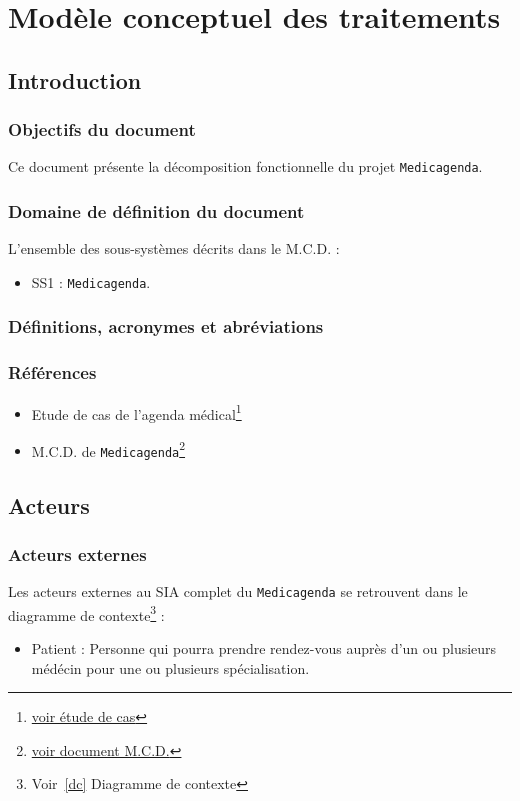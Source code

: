 \documentclass[a4paper, 11pt]{report}
\begin{document}

\tableofcontents

\chapter{Modèle conceptuel des traitements}

\section{Introduction}

\subsection{Objectifs du document}
Ce document présente la décomposition fonctionnelle du projet \texttt{Medicagenda}.
\subsection{Domaine de définition du document}
L'ensemble des sous-systèmes décrits dans le M.C.D. :
\begin{itemize}
	\item SS1 : \texttt{Medicagenda}.
\end{itemize}
\subsection{Définitions, acronymes et abréviations}
\subsection{Références}
\begin{itemize}
	\item[] Etude de cas de l'agenda
		médical\footnote{\href{../Enonce_Travail_Synthese_14-15.pdf}{voir
		étude de cas}}
	\item[] M.C.D. de \texttt{Medicagenda}\footnote{\href{../MCD/MCD.pdf}{voir document M.C.D.}}
\end{itemize}
\newpage
\section{Acteurs}
\subsection{Acteurs externes}
Les acteurs externes au SIA complet du \texttt{Medicagenda} se retrouvent dans le 
diagramme de contexte\footnote{Voir~\ref{dc} Diagramme de contexte} : 
\begin{itemize}
	\item Patient : Personne qui pourra prendre rendez-vous auprès d'un ou
		plusieurs médécin pour une ou plusieurs spécialisation.
\end{itemize}
\end{document}
